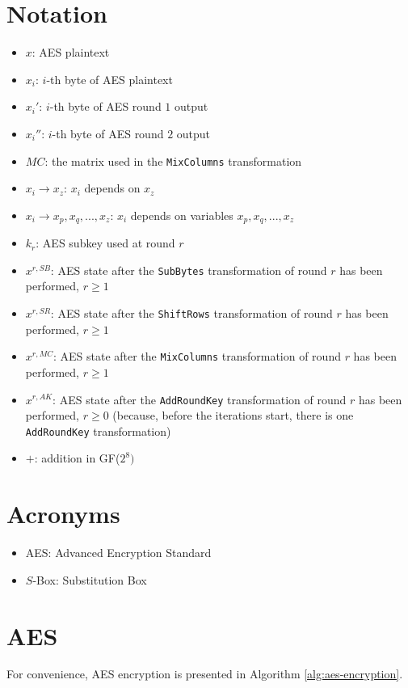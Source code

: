 \documentclass{report}
\begin{document}
\section{Notation}
\begin{itemize}
    \item $x$: AES plaintext
    \item $x_i$: $i$-th byte of AES plaintext
    \item $x_i'$: $i$-th byte of AES round $1$ output
    \item $x_i''$: $i$-th byte of AES round $2$ output
    \item $MC$: the matrix used in the \texttt{MixColumns} transformation
    \item $x_i \rightarrow x_z$: $x_i$ depends on $x_z$
    \item $x_i \rightarrow x_p, x_q, ..., x_z$: $x_i$ depends on variables $x_p, x_q, ..., x_z$
    \item $k_r$: AES subkey used at round $r$
    \item $x^{r, SB}$: AES state after the \texttt{SubBytes} transformation of round $r$ has been performed, $r \geq 1$
    \item $x^{r, SR}$: AES state after the \texttt{ShiftRows} transformation of round $r$ has been performed, $r \geq 1$
    \item $x^{r, MC}$: AES state after the \texttt{MixColumns} transformation of round $r$ has been performed, $r \geq 1$
    \item $x^{r, AK}$: AES state after the \texttt{AddRoundKey} transformation of round $r$ has been performed, $r \geq 0$ (because, before the iterations start, there is one \texttt{AddRoundKey} transformation)
    \item $+$: addition in GF($2^8)$
\end{itemize}

\section{Acronyms}
\begin{itemize}
    \item AES: Advanced Encryption Standard
    \item $S$-Box: Substitution Box
\end{itemize}

\section{AES}
For convenience, AES encryption is presented in Algorithm \ref{alg:aes-encryption}.
\end{document}
